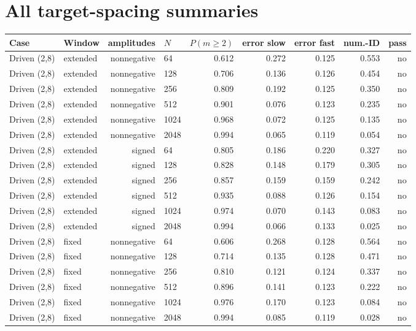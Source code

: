 \documentclass[10pt]{article}
\begin{document}
\section{All target-spacing summaries}
\scriptsize\begin{longtable}{llrlrrrrr}\toprule Case & Window & amplitudes & $N$ & $P(m\geq2)$ & error slow & error fast & num.-ID & pass\\\midrule\endhead
Driven (2,8) & extended & nonnegative & 64 & 0.612 & 0.272 & 0.125 & 0.553 & no \\
Driven (2,8) & extended & nonnegative & 128 & 0.706 & 0.136 & 0.126 & 0.454 & no \\
Driven (2,8) & extended & nonnegative & 256 & 0.809 & 0.192 & 0.125 & 0.350 & no \\
Driven (2,8) & extended & nonnegative & 512 & 0.901 & 0.076 & 0.123 & 0.235 & no \\
Driven (2,8) & extended & nonnegative & 1024 & 0.968 & 0.072 & 0.125 & 0.135 & no \\
Driven (2,8) & extended & nonnegative & 2048 & 0.994 & 0.065 & 0.119 & 0.054 & no \\
Driven (2,8) & extended & signed & 64 & 0.805 & 0.186 & 0.220 & 0.327 & no \\
Driven (2,8) & extended & signed & 128 & 0.828 & 0.148 & 0.179 & 0.305 & no \\
Driven (2,8) & extended & signed & 256 & 0.857 & 0.159 & 0.159 & 0.242 & no \\
Driven (2,8) & extended & signed & 512 & 0.935 & 0.088 & 0.126 & 0.154 & no \\
Driven (2,8) & extended & signed & 1024 & 0.974 & 0.070 & 0.143 & 0.083 & no \\
Driven (2,8) & extended & signed & 2048 & 0.994 & 0.066 & 0.133 & 0.025 & no \\
Driven (2,8) & fixed & nonnegative & 64 & 0.606 & 0.268 & 0.128 & 0.564 & no \\
Driven (2,8) & fixed & nonnegative & 128 & 0.714 & 0.135 & 0.128 & 0.471 & no \\
Driven (2,8) & fixed & nonnegative & 256 & 0.810 & 0.121 & 0.124 & 0.337 & no \\
Driven (2,8) & fixed & nonnegative & 512 & 0.896 & 0.141 & 0.123 & 0.222 & no \\
Driven (2,8) & fixed & nonnegative & 1024 & 0.976 & 0.170 & 0.123 & 0.084 & no \\
Driven (2,8) & fixed & nonnegative & 2048 & 0.994 & 0.085 & 0.119 & 0.028 & no \\

\end{longtable}
\end{document}
